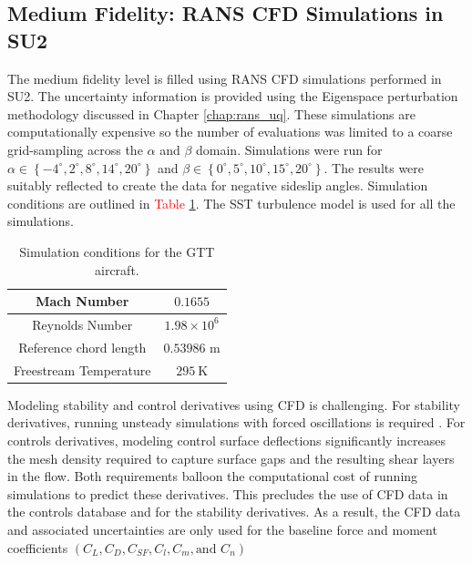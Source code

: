 \subsection{Medium Fidelity: RANS CFD Simulations in SU2} \label{subsec:gtt_cfd_data_gen}

The medium fidelity level is filled using RANS CFD simulations performed in SU2.
The uncertainty information is provided using the Eigenspace perturbation methodology discussed in Chapter \ref{chap:rans_uq}.
These simulations are computationally expensive so the number of evaluations was limited to a coarse grid-sampling across the $\alpha$ and $\beta$ domain.
Simulations were run for $\alpha \in \left \{ -4^\circ,2^\circ,8^\circ,14^\circ,20^\circ \right \}$ and $\beta \in \left \{ 0^\circ,5^\circ,10^\circ,15^\circ,20^\circ \right \}$.
The results were suitably reflected to create the data for negative sideslip angles. 
Simulation conditions are outlined in \textcolor{red}{Table \ref{tab:gtt_test_cond}}. 
The SST turbulence model is used for all the simulations.

\begin{table}
\centering
    \renewcommand{\arraystretch}{1.2}
    \captionsetup{justification=centering}
    \caption{Simulation conditions for the GTT aircraft.} 
    \begin{tabular}{|c|c|}
        \hline
        Mach Number & $0.1655$ \\ \hline
        Reynolds Number & $1.98\times10^6$ \\ \hline
        Reference chord length & $0.53986$ m \\ \hline
        Freestream Temperature & $295~\text{K}$ \\ \hline
    \end{tabular}
    \label{tab:gtt_test_cond}
\end{table}

Modeling stability and control derivatives using CFD is challenging.
For stability derivatives, running unsteady simulations with forced oscillations is required \cite{mcmillin_computational_2019}. 
For controls derivatives, modeling control surface deflections significantly increases the mesh density required to capture surface gaps and the resulting shear layers in the flow. 
Both requirements balloon the computational cost of running simulations to predict these derivatives. 
This precludes the use of CFD data in the controls database and for the stability derivatives.
As a result, the CFD data and associated uncertainties are only used for the baseline force and moment coefficients $\left ( C_L, C_D, C_{SF}, C_l, C_m, \text{and }C_n\right )$

